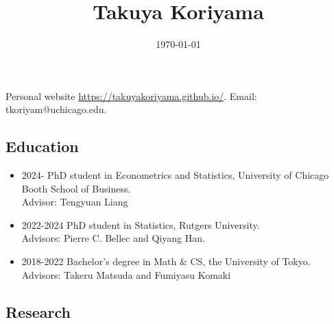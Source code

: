\documentclass[10pt]{amsart}
\date{\today}
\title{Takuya Koriyama}
\begin{document}
\maketitle
\begin{center}
  Personal website \url{https://takuyakoriyama.github.io/}.
Email: tkoriyam@uchicago.edu.
\end{center}
\subsection*{Education}
\begin{itemize}
  \item 2024- PhD student in Econometrics and Statistics, University of Chicago Booth School of Business.\\
  Advisor: Tengyuan Liang
  \item 2022-2024 PhD student in Statistics, Rutgers University. \\
  Advisors: Pierre C. Bellec and Qiyang Han.
  \item 2018-2022 Bachelor's degree in Math \& CS, the University of Tokyo. \\
  Advisors: Takeru Matsuda and Fumiyasu Komaki
\end{itemize}

\subsection*{Research}
\end{document}
